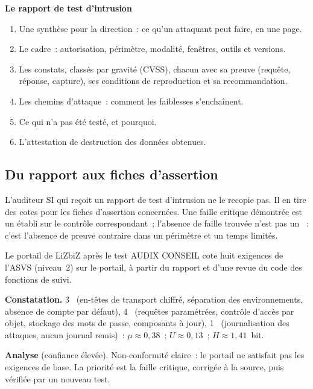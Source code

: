 \begin{boxprocedure}
\textbf{Le rapport de test d'intrusion}
\begin{enumerate}
    \item Une synthèse pour la direction~: ce qu'un attaquant peut faire,
          en une page.
    \item Le cadre~: autorisation, périmètre, modalité, fenêtres, outils et
          versions.
    \item Les constats, classés par gravité (CVSS), chacun avec sa preuve
          (requête, réponse, capture), ses conditions de reproduction et sa
          recommandation.
    \item Les chemins d'attaque~: comment les faiblesses s'enchaînent.
    \item Ce qui n'a pas été testé, et pourquoi.
    \item L'attestation de destruction des données obtenues.
\end{enumerate}
\end{boxprocedure}

\subsection{Du rapport aux fiches d'assertion}

L'auditeur SI qui reçoit un rapport de test d'intrusion ne le recopie pas.
Il en tire des cotes pour les fiches d'assertion concernées. Une faille
critique démontrée est un \NON{} établi sur le contrôle correspondant~;
l'absence de faille trouvée n'est pas un \OUI{}~: c'est l'absence de preuve
contraire dans un périmètre et un temps limités.

\begin{boxlecture}{Le portail de LiZbiZ après le test}
AUDIX CONSEIL cote huit exigences de l'ASVS (niveau~2) sur le portail, à
partir du rapport et d'une revue du code des fonctions de suivi.

\medskip
\textbf{Constatation.} 3~\OUI{} (en-têtes de transport chiffré, séparation
des environnements, absence de compte par défaut), 4~\NON{} (requêtes
paramétrées, contrôle d'accès par objet, stockage des mots de passe,
composants à jour), 1~\NEK{} (journalisation des attaques, aucun journal
remis)~: $\mu \approx 0{,}38$~; $U \approx 0{,}13$~; $H \approx 1{,}41$~bit.

\medskip
\textbf{Analyse} (confiance élevée). Non-conformité claire~: le portail ne
satisfait pas les exigences de base. La priorité est la faille critique,
corrigée à la source, puis vérifiée par un nouveau test.

\medskip
\hfill{}
\end{boxlecture}

